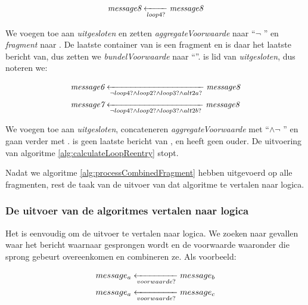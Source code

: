 \begin{align*}
	\transitionentry[\fragmessage{message8}]{\fragcond{loop4}}{\fragmessage{message8}}
\end{align*}

We voegen  toe aan \textit{uitgesloten} en zetten \textit{aggregateVoorwaarde} naar ``$\lnot$ '' en \textit{fragment} naar . De laatste container van  is een fragment en  is daar het laatste bericht van, dus zetten we \textit{bundelVoorwaarde} naar ``''.  is lid van \textit{uitgesloten}, dus noteren we:

\begin{align*}
	&\transitionentry[\fragmessage{message8}]{\lnot \fragcond{loop4} \land \fragcond{loop2} \land \fragcond{loop3} \land \fragcond{alt2a}}{\fragmessage{message6}} \\
	&\transitionentry[\fragmessage{message8}]{\lnot \fragcond{loop4} \land \fragcond{loop2} \land \fragcond{loop3} \land \fragcond{alt2b}}{\fragmessage{message7}}
\end{align*}

We voegen  toe aan \textit{uitgesloten}, concateneren \textit{aggregateVoorwaarde} met ``$\land \lnot$ '' en gaan verder met .  is geen laatste bericht van , en  heeft geen ouder. De uitvoering van algoritme \ref{alg:calculateLoopReentry} stopt.

\parbreak

Nadat we algoritme \ref{alg:processCombinedFragment} hebben uitgevoerd op alle fragmenten, rest de taak van de uitvoer van dat algoritme te vertalen naar logica.

\subsubsection{De uitvoer van de algoritmes vertalen naar logica}

Het is eenvoudig om de uitvoer te vertalen naar logica. We zoeken naar gevallen waar het bericht waarnaar gesprongen wordt en de voorwaarde waaronder die sprong gebeurt overeenkomen en combineren ze. Als voorbeeld:

\begin{align*}
	&\transitionentry[\fragmessage{$message_b$}]{\fragcond{voorwaarde}}{\fragmessage{$message_a$}} \\
	&\transitionentry[\fragmessage{$message_c$}]{\fragcond{voorwaarde}}{\fragmessage{$message_a$}}
\end{align*}

